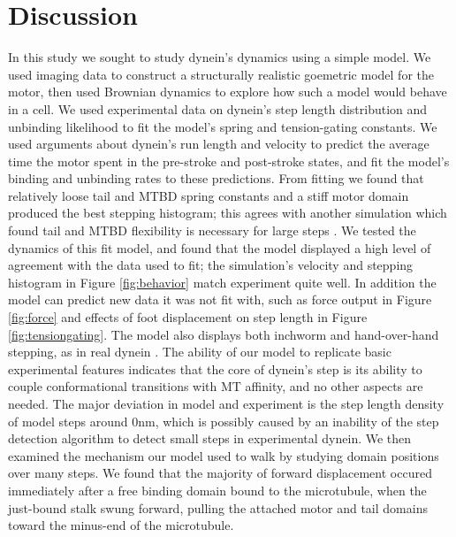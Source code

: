 \documentclass[9pt,twocolumn,twoside]{article}
\begin{document}
\section{Discussion}
In this study we sought to study dynein's dynamics using a simple model. We used imaging data to construct a structurally realistic goemetric model for the motor, then used Brownian dynamics to explore how such a model would behave in a cell. We used experimental data on dynein's step length distribution and unbinding likelihood to fit the model's spring and tension-gating constants. We used arguments about dynein's run length and velocity to predict the average time the motor spent in the pre-stroke and post-stroke states, and fit the model's binding and unbinding rates to these predictions. From fitting we found that relatively loose tail and MTBD spring constants and a stiff motor domain produced the best stepping histogram; this agrees with another simulation which found tail and MTBD flexibility is necessary for large steps \cite{tsygankovemsimulation}. We tested the dynamics of this fit model, and found that the model displayed a high level of agreement with the data used to fit; the simulation's velocity and stepping histogram in Figure \ref{fig:behavior} match experiment quite well. In addition the model can predict new data it was not fit with, such as force output in Figure \ref{fig:force} and effects of foot displacement on step length in Figure \ref{fig:tensiongating}. The model also displays both inchworm and hand-over-hand stepping, as in real dynein \cite{weihongpaper}. The ability of our model to replicate basic experimental features indicates that the core of dynein's step is its ability to couple conformational transitions with MT affinity, and no other aspects are needed. The major deviation in model and experiment is the step length density of model steps around 0nm, which is possibly caused by an inability of the step detection algorithm to detect small steps in experimental dynein. We then examined the mechanism our model used to walk by studying domain positions over many steps. We found that the majority of forward displacement occured immediately after a free binding domain bound to the microtubule, when the just-bound stalk swung forward, pulling the attached motor and tail domains toward the minus-end of the microtubule.
\end{document}
